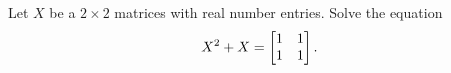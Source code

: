 \begin{pro}
Let $X$ be a $2\times 2$ matrices with real number entries. Solve
the equation $$X^2 + X = \begin{bmatrix} 1& 1 \cr 1 & 1 \cr
\end{bmatrix}.
$$
\end{pro}

